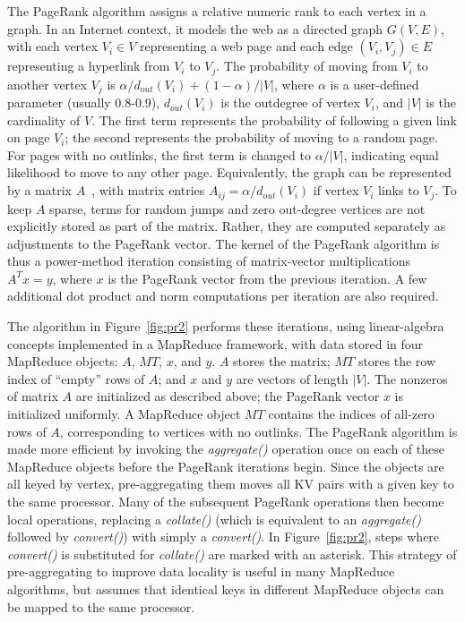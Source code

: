 The PageRank algorithm assigns a relative numeric rank to each vertex
in a graph.  In an Internet context, it models the web as a directed
graph $G(V,E)$, with each vertex $V_i \in V$ representing a web page
and each edge $(V_i, V_j) \in E$ representing a hyperlink from $V_i$
to $V_j$.  The probability of moving from $V_i$ to another vertex
$V_j$ is $\alpha/d_{out}(V_i) + (1-\alpha)/|V|$, where $\alpha$ is a
user-defined parameter (usually 0.8-0.9), $d_{out}(V_i)$ is the
outdegree of vertex $V_i$, and $|V|$ is the cardinality of $V$.  The
first term represents the probability of following a given link on
page $V_i$; the second represents the probability of moving to a
random page.  For pages with no outlinks, the first term is changed to
$\alpha/|V|$, indicating equal likelihood to move to any other page.
Equivalently, the graph can be represented by a matrix
$A$~\cite{LangvilleMeyer05a}, with matrix entries $A_{ij} =
\alpha/d_{out}(V_i)$ if vertex $V_i$ links to $V_j$.  To keep $A$
sparse, terms for random jumps and zero out-degree vertices are not
explicitly stored as part of the matrix.  Rather, they are computed
separately as adjustments to the PageRank vector.  The kernel of the
PageRank algorithm is thus a power-method iteration consisting of
matrix-vector multiplications $A^T x=y$, where $x$ is the PageRank
vector from the previous iteration.  A few additional dot product and
norm computations per iteration are also required.

The algorithm in Figure~\ref{fig:pr2} performs these iterations, using
linear-algebra concepts implemented in a MapReduce framework, with
data stored in four MapReduce objects: $A$, $MT$, $x$, and $y$.  $A$
stores the matrix; $MT$ stores the row index of ``empty'' rows of $A$; 
and $x$ and $y$ are
vectors of length $|V|$.  The nonzeros of matrix $A$ are initialized
as described above; the PageRank vector $x$ is initialized uniformly.
A MapReduce object $MT$ contains the indices of all-zero rows of $A$,
corresponding to vertices with no outlinks.  The PageRank algorithm is
made more efficient by invoking the {\it aggregate()} operation once
on each of these MapReduce objects before the PageRank iterations
begin.  Since the objects are all keyed by vertex, pre-aggregating
them moves all KV pairs with a given key to the same processor.  Many
of the subsequent PageRank operations then become local operations,
replacing a {\it collate()} (which is equivalent to an {\it
aggregate()} followed by {\it convert()}) with simply a {\it
convert()}.  In Figure~\ref{fig:pr2}, steps where {\it convert()} is
substituted for {\it collate()} are marked with an asterisk.  This
strategy of pre-aggregating to improve data locality is useful in many
MapReduce algorithms, but assumes that identical keys in different
MapReduce objects can be mapped to the same processor.

